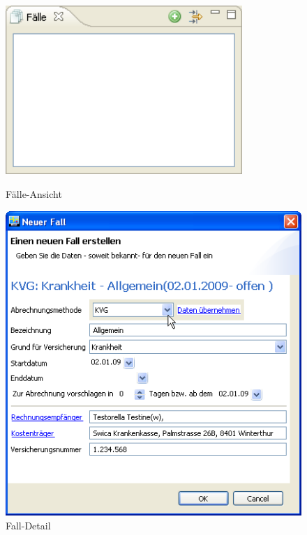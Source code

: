 \begin{figure}[htbp]
     \begin{minipage}{0.4\textwidth}
      \centering
       \includegraphics[width=0.8\textwidth]{images/einf3}
       \caption{Fälle-Ansicht}
       	\label{fig:faelle1}
     \end{minipage}\hfill
     \begin{minipage}{0.6\textwidth}
      \centering
       \includegraphics[width=1.0\textwidth]{images/einf4}
       \caption{Fall-Detail}
       \label{fig:falldetail}
     \end{minipage}
   \end{figure}


